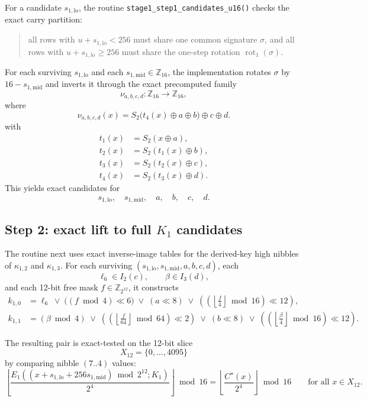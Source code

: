 \documentclass[11pt]{article}
\newcommand{\Z}[1]{\mathbb{Z}_{#1}}
\begin{document}
For a candidate $s_{1,\mathrm{lo}}$, the routine \texttt{stage1\_step1\_candidates\_u16()} checks the exact carry partition:
\begin{quote}
all rows with $u+s_{1,\mathrm{lo}}<256$ must share one common signature $\sigma$, and all rows with $u+s_{1,\mathrm{lo}}\ge 256$ must share the one-step rotation $\operatorname{rot}_1(\sigma)$.
\end{quote}
For each surviving $s_{1,\mathrm{lo}}$ and each $s_{1,\mathrm{mid}}\in\Z{16}$, the implementation rotates $\sigma$ by $16-s_{1,\mathrm{mid}}$ and inverts it through the exact precomputed family
\[
\nu_{a,b,c,d}:\Z{16}\to\Z{16},
\]
where
\[
\nu_{a,b,c,d}(x)=S_2\bigl(t_4(x)\oplus a\oplus b\bigr)\oplus c\oplus d.
\]
with
\begin{align*}
t_1(x)&=S_2(x\oplus a),\\
t_2(x)&=S_2(t_1(x)\oplus b),\\
t_3(x)&=S_2(t_2(x)\oplus c),\\
t_4(x)&=S_2(t_3(x)\oplus d).
\end{align*}
This yields exact candidates for
\[
s_{1,\mathrm{lo}},\quad s_{1,\mathrm{mid}},\quad a,\quad b,\quad c,\quad d.
\]

\subsection{Step 2: exact lift to full \texorpdfstring{$K_1$}{K1} candidates}
The routine next uses exact inverse-image tables for the derived-key high nibbles of $\kappa_{1,2}$ and $\kappa_{1,3}$. For each surviving $(s_{1,\mathrm{lo}},s_{1,\mathrm{mid}},a,b,c,d)$, each
\[
\ell_6\in I_2(c),\qquad \beta\in I_3(d),
\]
and each 12-bit free mask $f\in\Z{2^{12}}$, it constructs
\begin{align}
k_{1,0}
&=
\ell_6
\;\vee\;
\bigl((f\bmod 4)\ll 6\bigr)
\;\vee\;
(a\ll 8)
\;\vee\;
\left(\left(\left\lfloor\frac{f}{4}\right\rfloor\bmod 16\right)\ll 12\right), \label{eq:k10-lift}\\
k_{1,1}
&=
(\beta\bmod 4)
\;\vee\;
\left(\left(\left\lfloor\frac{f}{64}\right\rfloor\bmod 64\right)\ll 2\right)
\;\vee\;
(b\ll 8)
\;\vee\;
\left(\left(\left\lfloor\frac{\beta}{4}\right\rfloor\bmod 16\right)\ll 12\right). \label{eq:k11-lift}
\end{align}

The resulting pair is exact-tested on the 12-bit slice
\[
X_{12}=\{0,\dots,4095\}
\]
by comparing nibble $(7..4)$ values:
\[
\left\lfloor\frac{E_1((x+s_{1,\mathrm{lo}}+256s_{1,\mathrm{mid}})\bmod 2^{12};K_1)}{2^4}\right\rfloor\bmod 16
=
\left\lfloor\frac{C^\star(x)}{2^4}\right\rfloor\bmod 16
\qquad\text{for all }x\in X_{12}.
\]
\end{document}
